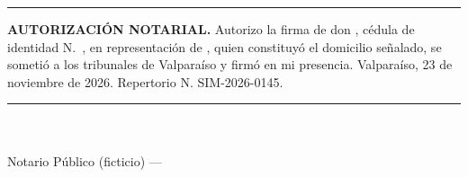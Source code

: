 \documentclass[11pt]{article}
\begin{document}
\vspace{8pt}
\noindent\rule{\linewidth}{0.4pt}\par\smallskip
\noindent\begin{minipage}[b]{0.68\linewidth}\small
  \textbf{AUTORIZACIÓN NOTARIAL.} Autorizo la firma de don \textbf{\LFXrepresentante}, cédula de identidad N.\textdegree~\SIMrunrepresentante, en representación de \LFXempresa, quien constituyó el domicilio señalado, se sometió a los tribunales de Valparaíso y firmó en mi presencia. Valparaíso, 23 de noviembre de 2026. Repertorio N.\textdegree{} SIM-2026-0145.

  \vspace{14pt}
  \rule{6cm}{0.4pt}\\
  \SIMnotarioTitular\\ Notario Público (ficticio) --- \SIMnotaria\\ \SIMnotariaDir
\end{minipage}\hfill
\begin{minipage}[b]{3cm}\raggedleft\SIMtimbrenotarial[2.6cm]\end{minipage}
\end{document}
